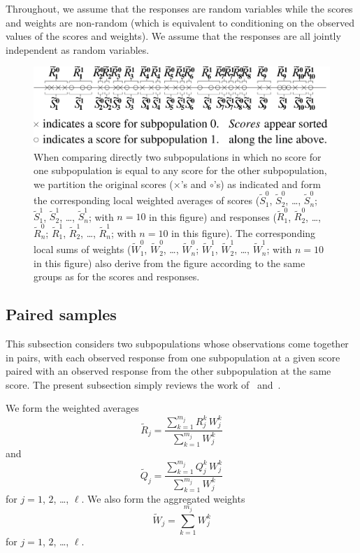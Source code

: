 \documentclass[]{fairmeta}
\begin{document}
Throughout, we assume that the responses are random variables
while the scores and weights are non-random
(which is equivalent to conditioning on the observed values of the scores
and weights). We assume that the responses are all jointly independent
as random variables.


\begin{figure}
%
\begin{center}
\includegraphics[width=.53\textwidth]{./figures/partition}
\end{center}
%
\caption{When comparing directly two subpopulations in which no score
for one subpopulation is equal to any score for the other subpopulation,
we partition the original scores ($\times$'s and $\circ$'s)
as indicated and form the corresponding local weighted averages of scores
($\tilde{S}_1^0$, $\tilde{S}_2^0$, \dots, $\tilde{S}_n^0$;
$\tilde{S}_1^1$, $\tilde{S}_2^1$, \dots, $\tilde{S}_n^1$;
with $n = 10$ in this figure) and responses
($\tilde{R}_1^0$, $\tilde{R}_2^0$, \dots, $\tilde{R}_n^0$;
$\tilde{R}_1^1$, $\tilde{R}_2^1$, \dots, $\tilde{R}_n^1$;
with $n = 10$ in this figure). The corresponding local sums of weights
($\tilde{W}_1^0$, $\tilde{W}_2^0$, \dots, $\tilde{W}_n^0$;
$\tilde{W}_1^1$, $\tilde{W}_2^1$, \dots, $\tilde{W}_n^1$;
with $n = 10$ in this figure) also derive from the figure
according to the same groups as for the scores and responses.}
\label{partition}
%
\end{figure}


\subsection{Paired samples}
\label{paired}

This subsection considers two subpopulations whose observations come together
in pairs, with each observed response from one subpopulation at a given score
paired with an observed response from the other subpopulation
at the same score. The present subsection simply reviews the work
of~\cite{kloumann-korevaar-mcconnell-tygert-zhao}
and~\cite{tygert_pvals}.

We form the weighted averages
%
\begin{equation}
\tilde{R}_j = \frac{\sum_{k=1}^{m_j} R_j^k \, W_j^k}{\sum_{k=1}^{m_j} W_j^k}
\end{equation}
%
and
%
\begin{equation}
\tilde{Q}_j = \frac{\sum_{k=1}^{m_j} Q_j^k \, W_j^k}{\sum_{k=1}^{m_j} W_j^k}
\end{equation}
%
for $j = 1$, $2$, \dots, $\ell$.
We also form the aggregated weights
%
\begin{equation}
\tilde{W}_j = \sum_{k=1}^{m_j} W_j^k
\end{equation}
%
for $j = 1$, $2$, \dots, $\ell$.
\end{document}
